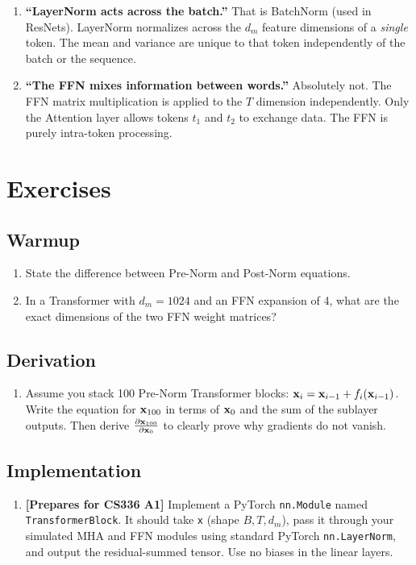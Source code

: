 \begin{enumerate}
  \item \textbf{``LayerNorm acts across the batch.''} That is BatchNorm (used in ResNets). LayerNorm normalizes across the $d_m$ feature dimensions of a \emph{single} token. The mean and variance are unique to that token independently of the batch or the sequence.
  \item \textbf{``The FFN mixes information between words.''} Absolutely not. The FFN matrix multiplication is applied to the $T$ dimension independently. Only the Attention layer allows tokens $t_1$ and $t_2$ to exchange data. The FFN is purely intra-token processing.
\end{enumerate}


\section{Exercises}
\label{ch:10:sec:exercises}

\subsection*{Warmup}
\begin{enumerate}
  \item State the difference between Pre-Norm and Post-Norm equations.
  \item In a Transformer with $d_m=1024$ and an FFN expansion of 4, what are the exact dimensions of the two FFN weight matrices?
\end{enumerate}

\subsection*{Derivation}
\begin{enumerate}
  \item Assume you stack 100 Pre-Norm Transformer blocks: $\mathbf{x}_{i} = \mathbf{x}_{i-1} + f_i(\mathbf{x}_{i-1})$. Write the equation for $\mathbf{x}_{100}$ in terms of $\mathbf{x}_0$ and the sum of the sublayer outputs. Then derive $\frac{\partial \mathbf{x}_{100}}{\partial \mathbf{x}_0}$ to clearly prove why gradients do not vanish.
\end{enumerate}

\subsection*{Implementation}
\begin{enumerate}
  \item \textbf{[Prepares for CS336 A1]} Implement a PyTorch \texttt{nn.Module} named \texttt{TransformerBlock}. It should take \texttt{x} (shape $B, T, d_m$), pass it through your simulated MHA and FFN modules using standard PyTorch \texttt{nn.LayerNorm}, and output the residual-summed tensor. Use no biases in the linear layers.
\end{enumerate}

